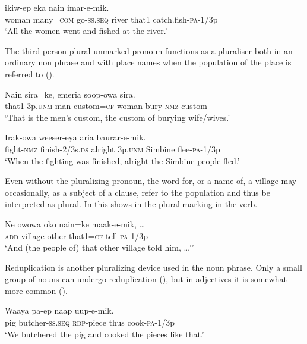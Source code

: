 \ea%
\label{ex:6:x1287}
\gll {}    ikiw-ep  eka  nain  imar-e-mik. \\
woman  many=\textsc{com}  go-\textsc{ss}.\textsc{seq}  river  that1  catch.fish-\textsc{pa}-1/3p\\
\glt `All the women went and fished at the river.'
\z

The third person plural unmarked pronoun functions as a pluraliser both in an ordinary non phrase  and with place names when the population of the place is referred to  (). 

\ea%
\label{ex:6:x1288}
\gll Nain     sira=ke,  emeria  soop-owa  sira. \\
that1  3p.\textsc{unm}  man  custom=\textsc{cf}  woman  bury-\textsc{nmz}  custom\\
\glt `That is the men's custom, the custom of burying wife/wives.'
\z

\ea%
\label{ex:6:x1289}
\gll Irak-owa  weeser-eya  aria     baurar-e-mik.\\
fight-\textsc{nmz}  finish-2/3s.\textsc{ds}  alright  3p.\textsc{unm}  Simbine flee-\textsc{pa}-1/3p\\
\glt `When the fighting was finished, alright the Simbine people fled.'
\z

Even without the pluralizing pronoun, the word for, or a name of, a village may occasionally, as a subject of a clause, refer to the population and thus be interpreted as plural. In  this shows in the plural marking in the verb. 

\ea%
\label{ex:6:x1307}
\gll Ne  owowa  oko  nain=ke  maak-e-mik,  {\dots} \\
\textsc{add}  village  other  that1=\textsc{cf}  tell-\textsc{pa}-1/3p\\
\glt `And (the people of) that other village told him, {\dots}''
\z

Reduplication is another pluralizing device used in the noun phrase. Only a small group of nouns can undergo reduplication  (), but in adjectives it is somewhat more common  ().

\ea%
\label{ex:6:x1290}
\gll Waaya  pa-ep    naap  uup-e-mik. \\
pig  butcher-\textsc{ss}.\textsc{seq}  \textsc{rdp}-piece  thus  cook-\textsc{pa}-1/3p\\
\glt `We butchered the pig and cooked the pieces like that.'
\z

